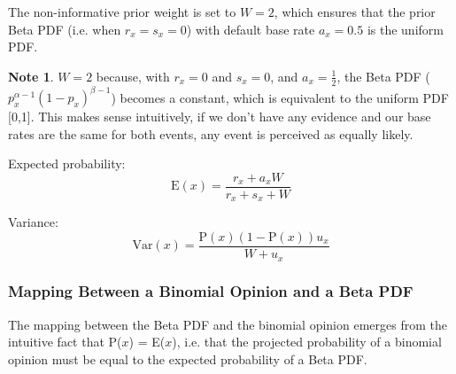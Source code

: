 \documentclass[a4paper,12pt]{article}
\theoremstyle{definition}
\newtheorem{note}{Note}[section]
\numberwithin{equation}{section}
\begin{document}
The non-informative prior weight is set to $W = 2$, which ensures that the prior Beta PDF (i.e. when $r_x = s_x = 0$) with default base rate $a_x = 0.5$ is the uniform PDF.

\begin{note}
	$W = 2$ because, with $r_x = 0$ and $s_x = 0$, and $a_x = \frac{1}{2}$, the Beta PDF ($p_x^{\alpha-1}(1-p_x)^{\beta-1}$) becomes a constant, which is equivalent to the uniform PDF [0,1]. This makes sense intuitively, if we don't have any evidence and our base rates are the same for both events, any event is perceived as equally likely. 
\end{note}

Expected probability:
\begin{equation}
	\mathrm{E}(x) = \frac{r_x + a_x W}{r_x + s_x + W}
\end{equation}

Variance:
\begin{equation}
	\mathrm{Var}(x) = \frac{\mathrm{P}(x)(1 - \mathrm{P}(x))u_x}{W + u_x}
\end{equation}

\subsubsection{Mapping Between a Binomial Opinion and a Beta PDF}

The mapping between the Beta PDF and the binomial opinion emerges from the intuitive fact that P($x$) = E($x$), i.e. that the projected probability of a
binomial opinion must be equal to the expected probability of a Beta PDF.
\end{document}

